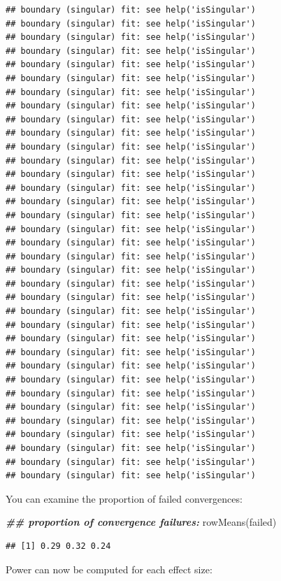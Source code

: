 \documentclass[
  12pt,
]{krantz}
\newenvironment{Shaded}{\begin{snugshade}}{\end{snugshade}}
\newcommand{\DocumentationTok}[1]{\textcolor[rgb]{0.56,0.35,0.01}{\textbf{\textit{#1}}}}
\newcommand{\FunctionTok}[1]{\textcolor[rgb]{0.00,0.00,0.00}{#1}}
\newcommand{\NormalTok}[1]{#1}
\theoremstyle{definition}
\theoremstyle{definition}
\theoremstyle{definition}
\theoremstyle{definition}
\theoremstyle{remark}
\begin{document}
\begin{verbatim}
## boundary (singular) fit: see help('isSingular')
## boundary (singular) fit: see help('isSingular')
## boundary (singular) fit: see help('isSingular')
## boundary (singular) fit: see help('isSingular')
## boundary (singular) fit: see help('isSingular')
## boundary (singular) fit: see help('isSingular')
## boundary (singular) fit: see help('isSingular')
## boundary (singular) fit: see help('isSingular')
## boundary (singular) fit: see help('isSingular')
## boundary (singular) fit: see help('isSingular')
## boundary (singular) fit: see help('isSingular')
## boundary (singular) fit: see help('isSingular')
## boundary (singular) fit: see help('isSingular')
## boundary (singular) fit: see help('isSingular')
## boundary (singular) fit: see help('isSingular')
## boundary (singular) fit: see help('isSingular')
## boundary (singular) fit: see help('isSingular')
## boundary (singular) fit: see help('isSingular')
## boundary (singular) fit: see help('isSingular')
## boundary (singular) fit: see help('isSingular')
## boundary (singular) fit: see help('isSingular')
## boundary (singular) fit: see help('isSingular')
## boundary (singular) fit: see help('isSingular')
## boundary (singular) fit: see help('isSingular')
## boundary (singular) fit: see help('isSingular')
## boundary (singular) fit: see help('isSingular')
## boundary (singular) fit: see help('isSingular')
## boundary (singular) fit: see help('isSingular')
## boundary (singular) fit: see help('isSingular')
## boundary (singular) fit: see help('isSingular')
## boundary (singular) fit: see help('isSingular')
## boundary (singular) fit: see help('isSingular')
## boundary (singular) fit: see help('isSingular')
## boundary (singular) fit: see help('isSingular')
## boundary (singular) fit: see help('isSingular')
\end{verbatim}

You can examine the proportion of failed convergences:

\begin{Shaded}
\begin{Highlighting}[]
\DocumentationTok{\#\# proportion of convergence failures:}
\FunctionTok{rowMeans}\NormalTok{(failed)}
\end{Highlighting}
\end{Shaded}

\begin{verbatim}
## [1] 0.29 0.32 0.24
\end{verbatim}

Power can now be computed for each effect size:
\end{document}
